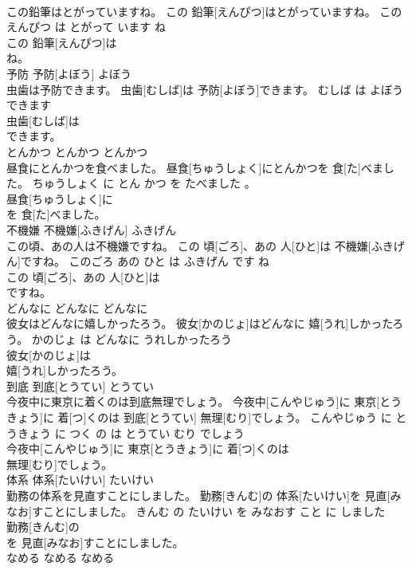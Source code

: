 \documentclass[8pt]{extreport}
\begin{document}
\begin{CJK}{UTF8}{min}
\\	この鉛筆はとがっていますね。	この 鉛筆[えんぴつ]はとがっていますね。	この えんぴつ は とがって います ね	
\\	この 鉛筆[えんぴつ]は
\\	ね。			
\\	予防	予防[よぼう]	よぼう	
\\	虫歯は予防できます。	虫歯[むしば]は 予防[よぼう]できます。	むしば は よぼう できます	
\\	虫歯[むしば]は
\\	できます。			
\\	とんかつ	とんかつ	とんかつ	
\\	昼食にとんかつを食べました。	昼食[ちゅうしょく]にとんかつを 食[た]べました。	ちゅうしょく に とん かつ を たべました 。	
\\	昼食[ちゅうしょく]に
\\	を 食[た]べました。			
\\	不機嫌	不機嫌[ふきげん]	ふきげん	
\\	この頃、あの人は不機嫌ですね。	この 頃[ごろ]、あの 人[ひと]は 不機嫌[ふきげん]ですね。	このごろ あの ひと は ふきげん です ね	
\\	この 頃[ごろ]、あの 人[ひと]は
\\	ですね。			
\\	どんなに	どんなに	どんなに	
\\	彼女はどんなに嬉しかったろう。	彼女[かのじょ]はどんなに 嬉[うれ]しかったろう。	かのじょ は どんなに うれしかったろう	
\\	彼女[かのじょ]は
\\	嬉[うれ]しかったろう。			
\\	到底	到底[とうてい]	とうてい	
\\	今夜中に東京に着くのは到底無理でしょう。	今夜中[こんやじゅう]に 東京[とうきょう]に 着[つ]くのは 到底[とうてい] 無理[むり]でしょう。	こんやじゅう に とうきょう に つく の は とうてい むり でしょう	
\\	今夜中[こんやじゅう]に 東京[とうきょう]に 着[つ]くのは
\\	無理[むり]でしょう。			
\\	体系	体系[たいけい]	たいけい	
\\	勤務の体系を見直すことにしました。	勤務[きんむ]の 体系[たいけい]を 見直[みなお]すことにしました。	きんむ の たいけい を みなおす こと に しました	
\\	勤務[きんむ]の
\\	を 見直[みなお]すことにしました。			
\\	なめる	なめる	なめる	

\end{CJK}
\end{document}
